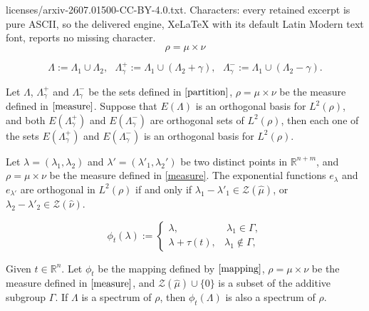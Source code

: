 \documentclass[10pt,a4paper]{amsart}
\newcommand{\R}{{\mathbb R}}
\begin{document}
licenses/arxiv-2607.01500-CC-BY-4.0.txt. Characters: every retained excerpt is pure ASCII, so the delivered engine, XeLaTeX with its default Latin Modern text font, reports no missing character.
\begin{equation}\label{measure}
\rho = \mu\times \nu    
\end{equation}

\begin{equation}\label{partition}
\Lambda:=\Lambda_{1}\cup \Lambda_{2},\ \ \ \Lambda^{+}_\gamma:=\Lambda_{1}\cup (\Lambda_{2}+\gamma),\ \ \ \Lambda^{-}_\gamma:=\Lambda_{1}\cup (\Lambda_{2}-\gamma).
\end{equation}

\begin{lemma}\label{3or}Let $\Lambda$, $\Lambda^{+}_\gamma$ and $\Lambda^{-}_\gamma$ be the sets defined in $\eqref{partition}$, $\rho=\mu\times\nu$ be the measure defined in $\eqref{measure}$.
Suppose that $E(\Lambda)$ is an orthogonal basis for $L^2(\rho)$, and both $E(\Lambda^{+}_\gamma)$ and $E(\Lambda^{-}_\gamma)$ are orthogonal sets of $L^2(\rho)$, then each one of the sets $E(\Lambda^{+}_\gamma)$ and $E(\Lambda^{-}_\gamma)$ is an orthogonal basis for $L^2(\rho)$.
\end{lemma}

\begin{lemma}\label{zero}
Let $\lambda =(\lambda_1,\lambda_2)$ and $\lambda'=(\lambda'_1,\lambda_2')$ be two distinct points in $\mathbb{R}^{n+m}$, and $\rho=\mu\times\nu$ be the measure defined in \eqref{measure}. The exponential functions $e_{\lambda}$ and $e_{\lambda'}$ are orthogonal in $L^{2}(\rho)$ if and only if $\lambda_{1}-\lambda'_{1}\in \mathcal{Z}(\widehat{\mu})$, or $\lambda_{2}-\lambda'_{2}\in \mathcal{Z}(\widehat{\nu})$. %
\end{lemma}

\begin{equation}\label{mapping}
\phi_{t}(\lambda):=
\left\{\begin{matrix}
\lambda,\ \ \ \ \ \ \ \ \ & \ \lambda_{1}\in  \Gamma,\\
\lambda+\tau(t),& \lambda_{1}\notin \Gamma,
\end{matrix}\right.
\end{equation}

\begin{proposition}\label{mapspectrum}
 Given $t\in \R^n$. Let $\phi_{t}$ be the mapping defined by $\eqref{mapping}$, $\rho=\mu\times\nu$ be the measure defined in $\eqref{measure}$, and ${\mathcal Z}(\widehat{\mu})\cup \{0\}$ is a subset of  the {additive} subgroup $\Gamma$. If $\Lambda$ is a spectrum of $\rho$, then
$\phi_{t}(\Lambda)$ is also a spectrum of $\rho$.
\end{proposition}
\end{document}
